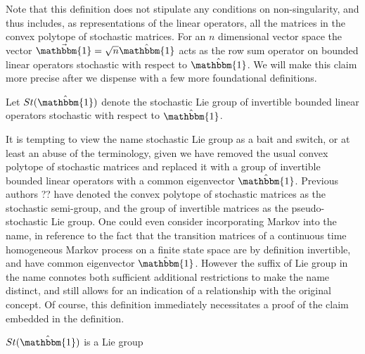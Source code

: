 Note that this definition does not stipulate any conditions on non-singularity,
and thus includes, as representations of the linear operators, all the matrices 
in the convex polytope of stochastic matrices. For an $n$ dimensional vector 
space the vector $\vec{\mathbbm{1}} = \sqrt{n} \hat{\mathbbm{1}}$ acts as the 
row sum operator on bounded linear operators stochastic with respect to $\hat{\mathbbm{1}}$. 
We will make this claim more precise after we dispense with a few more 
foundational definitions.

\begin{definition}
	Let $St(\hat{\mathbbm{1}})$ denote the stochastic Lie group of invertible 
	bounded linear operators stochastic with respect to $\hat{\mathbbm{1}}$.
\end{definition}

It is tempting to view the name stochastic Lie group as a bait and switch, or 
at least an abuse of the terminology, given we have removed the usual convex
polytope of stochastic matrices and replaced it with a group of invertible 
bounded linear operators with a common eigenvector $\hat{\mathbbm{1}}$. Previous 
authors ?? have denoted the convex polytope of stochastic matrices as the 
stochastic semi-group, and the group of invertible matrices as the 
pseudo-stochastic Lie group. One could even consider incorporating Markov into 
the name, in reference to the fact that the transition matrices of a continuous 
time homogeneous Markov process on a finite state space are by definition 
invertible, and have common eigenvector $\hat{\mathbbm{1}}$. However the suffix 
of Lie group in the name connotes both sufficient additional restrictions to 
make the name distinct, and still allows for an indication of a relationship 
with the original concept. Of course, this definition immediately necessitates a
proof of the claim embedded in the definition.

\begin{lemma}
	$St(\hat{\mathbbm{1}})$ is a Lie group
\end{lemma}

